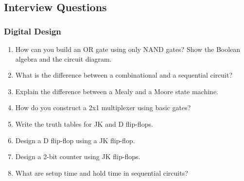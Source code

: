 \subsection*{Interview Questions}

\subsubsection*{Digital Design}
\begin{enumerate}
    \item How can you build an OR gate using only NAND gates? Show the Boolean algebra
        and the circuit diagram.
    \item What is the difference between a combinational and a sequential circuit?
    \item Explain the difference between a Mealy and a Moore state machine.
    \item How do you construct a 2x1 multiplexer using basic gates?
    \item Write the truth tables for JK and D flip-flops.
    \item Design a D flip-flop using a JK flip-flop.
    \item Design a 2-bit counter using JK flip-flops.
    \item What are setup time and hold time in sequential circuits?
\end{enumerate}

